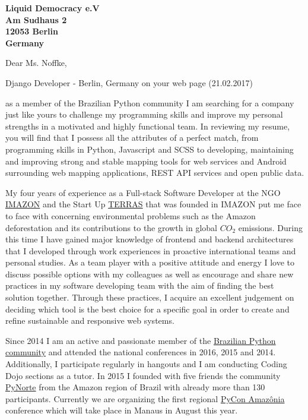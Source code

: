 \documentclass[a4paper]{joaosoares-letter}
\begin{document}
\longindentation=0pt


\begin{letter}{\bfseries Liquid Democracy e.V\\Am Sudhaus 2\\12053 Berlin\\Germany}


\date{Belém, \today}


\opening{Dear Ms. Noffke,}{Django Developer - Berlin, Germany on your web page (21.02.2017)}

as a member of the Brazilian Python community I am searching for a company just like yours to challenge my programming skills and improve my personal strengths in a motivated and highly functional team. In reviewing my resume, you will find that I possess all the attributes of a perfect match, from programming skills in Python, Javascript and SCSS to developing, maintaining and improving strong and stable mapping tools for web services and Android surrounding web mapping applications, REST API services and open public data.

My four years of experience as a Full-stack Software Developer at the NGO \href{http://imazon.org.br/?lang=en}{IMAZON} and the Start Up \href{http://terras.agr.br/}{TERRAS} that was founded in IMAZON put me face to face with concerning environmental problems such as the Amazon deforestation and its contributions to the growth in global $CO_2$ emissions. During this time I have gained major knowledge of frontend and backend architectures that I developed through work experiences in proactive international teams and personal studies. As a team player with a positive attitude and energy I love to discuss possible options with my colleagues as well as encourage and share new practices in my software developing team with the aim of finding the best solution together. Through these practices, I acquire an excellent judgement on deciding which tool is the best choice for a specific goal in order to create and refine sustainable and responsive web systems.

Since 2014 I am an active and passionate member of the \href{http://python.org.br}{Brazilian Python community} and attended the national conferences in 2016, 2015 and 2014. Additionally, I participate regularly in hangouts and I am conducting Coding Dojo sections as a tutor. In 2015 I founded with five friends the community \href{http://pynorte.python.org.br}{PyNorte} from the Amazon region of Brazil with already more than 130 participants. Currently we are organizing the first regional \href{http://amazonia.python.org.br/}{PyCon Amazônia} conference which will take place in Manaus in August this year.


\end{letter}
\end{document}
